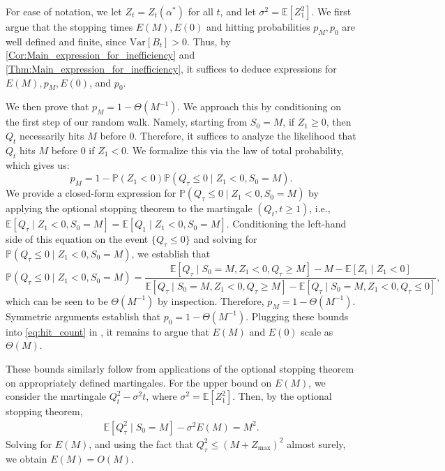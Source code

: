 \documentclass[mnsc,nonblindrev]{informs3}
\newcommand{\E}{\mathbb{E}}
\newcommand{\pr}{\mathbb{P}}
\renewcommand{\Pr}{\pr}
\renewenvironment{proof}[1][Proof]{%
  \par\noindent{\itshape #1.} \ignorespaces
}{%
  \hfill\Halmos\par
}
\begin{document}
\begin{proof}[Proof sketch]
For ease of notation, we let $Z_t = Z_t(\alpha^*)$ for all $t$, and let $\sigma^2 = \mathbb{E}[Z_1^2]$. We first argue that the stopping times $E(M), E(0)$ and hitting probabilities $p_M, p_0$ are well defined and finite, since $\text{Var}[B_t] > 0$. Thus, by \cref{Cor:Main_expression_for_inefficiency} and \cref{Thm:Main_expression_for_inefficiency}, it suffices to deduce expressions for $E(M), p_M, E(0)$, and $p_0$. 

We then prove that $p_M = 1-\Theta(M^{-1})$. We approach this by conditioning on the first step of our random walk. Namely, starting from $S_0 = M$, if $Z_1 \geq 0$, then $Q_t$ necessarily hits $M$ before 0. Therefore, it suffices to analyze the likelihood that $Q_t$ hits $M$ before 0 if $Z_1 < 0$. We formalize this via the law of total probability, which gives us:
\[p_M = 1-\Pr(Z_1 < 0)\Pr(Q_\tau \leq 0 \mid Z_1 < 0, S_0 = M).\]
We provide a closed-form expression for $\Pr(Q_\tau \leq 0 \mid Z_1 < 0, S_0 = M)$ by applying the optional stopping theorem to the martingale $(Q_t, t \geq 1)$, i.e., $\E[Q_\tau \mid Z_1 < 0, S_0 = M] = \E[Q_1 \mid Z_1 < 0, S_0 = M]$.
Conditioning the left-hand side of this equation on the event $\{Q_\tau \leq 0\}$ and solving for $\Pr(Q_\tau \leq 0 \mid Z_1 < 0, S_0 = M)$, we establish that
\[\Pr(Q_\tau \leq 0 \mid Z_1 < 0, S_0 = M) =\frac{\E[Q_\tau \mid S_0 = M, Z_1 < 0, Q_\tau \geq M]-M-\E[Z_1 \mid Z_1 < 0]}{\E[Q_\tau \mid S_0 = M, Z_1 < 0, Q_\tau \geq M]-\E[Q_\tau \mid S_0 = M, Z_1 < 0, Q_\tau \leq 0]},\]
which can be seen to be $\Theta(M^{-1})$ by inspection. Therefore, $p_M = 1-\Theta(M^{-1})$. Symmetric arguments establish that $p_0 = 1-\Theta(M^{-1})$. Plugging these bounds into \eqref{eq:hit_count} in , it remains to argue that $E(M)$ and $E(0)$ scale as $\Theta(M)$.

These bounds similarly follow from applications of the optional stopping theorem on appropriately defined martingales. For the upper bound on $E(M)$, we consider the martingale $Q_t^2 - \sigma^2t$, where $\sigma^2 = \E[Z_1^2]$. Then, by the optional stopping theorem,
\begin{align}\label{eq:opt-stop-em-sketch}
\E[Q_\tau^2 \mid S_0 = M]-\sigma^2 E(M) = M^2.
\end{align}
Solving for $E(M)$, and using the fact that $Q_{\tau}^2 \leq (M + Z_{\max})^2$ almost surely, we obtain $E(M) = O(M)$. 


\end{proof}
\end{document}
